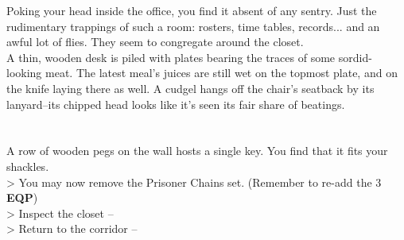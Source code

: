 Poking your head inside the office, you find it absent of any sentry. Just the rudimentary trappings of such a room: rosters, time tables, records... and an awful lot of flies. They seem to congregate around the closet.\\

A thin, wooden desk is piled with plates bearing the traces of some sordid-looking meat. The latest meal’s juices are still wet on the topmost plate, and on the knife laying there as well. A cudgel hangs off the chair’s seatback by its lanyard--its chipped head looks like it’s seen its fair share of beatings.\\
\\
\\

A row of wooden pegs on the wall hosts a single key. You find that it fits your shackles.\\
> You may now remove the Prisoner Chains set. (Remember to re-add the 3 \textbf{EQP})\\

> Inspect the closet --  \\
> Return to the corridor -- 